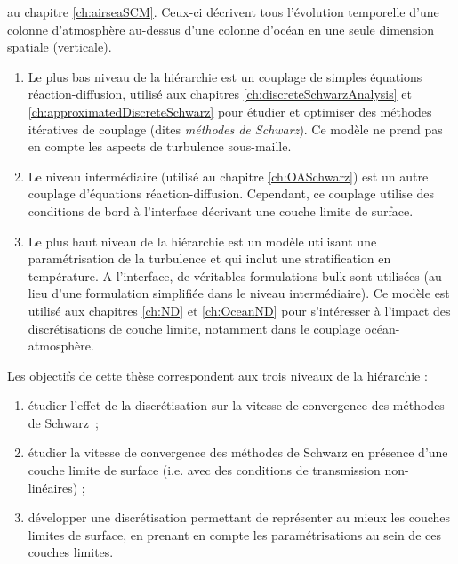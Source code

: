 au chapitre \ref{ch:airseaSCM}. Ceux-ci
décrivent tous l'évolution temporelle d'une colonne d'atmosphère
au-dessus d'une colonne d'océan en une seule dimension spatiale
(verticale).
\par
\begin{enumerate}
	\item Le plus bas niveau de la hiérarchie est un couplage
	de simples équations réaction-diffusion, utilisé aux chapitres
		\ref{ch:discreteSchwarzAnalysis} et
		\ref{ch:approximatedDiscreteSchwarz} pour étudier
		et optimiser des méthodes itératives de
		couplage (dites \textit{méthodes de Schwarz}).
		Ce modèle ne prend pas en compte les aspects
		de turbulence sous-maille.
	\item Le niveau intermédiaire (utilisé au chapitre
		\ref{ch:OASchwarz}) est un autre couplage
		d'équations réaction-diffusion.
		Cependant, ce couplage utilise des conditions de bord
		à l'interface décrivant une couche limite de surface.
\item Le plus haut niveau de la hiérarchie est un modèle utilisant
une paramétrisation de la turbulence et qui inclut une
stratification en température.
A l'interface, de véritables formulations bulk sont utilisées
(au lieu d'une formulation simplifiée dans le niveau intermédiaire).
Ce modèle est utilisé aux chapitres \ref{ch:ND}
et \ref{ch:OceanND} pour
s'intéresser à l'impact des discrétisations de couche limite,
notamment dans le couplage océan-atmosphère.
\end{enumerate}
Les objectifs de cette thèse correspondent aux trois niveaux de la
hiérarchie :
\begin{enumerate}
	\item étudier l'effet de la discrétisation sur la vitesse de
		convergence des méthodes de Schwarz~;
	\item étudier la vitesse de convergence des méthodes de
		Schwarz en présence d'une couche limite de surface
		(i.e. avec des conditions de transmission
		non-linéaires) ;
	\item développer une discrétisation permettant de représenter
		au mieux les couches limites de surface, en prenant
		en compte les paramétrisations au sein de ces
		couches limites.
\end{enumerate}

